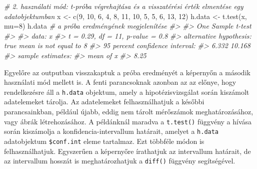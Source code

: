 \documentclass[
]{book}
\newenvironment{Shaded}{\begin{snugshade}}{\end{snugshade}}
\newcommand{\AttributeTok}[1]{\textcolor[rgb]{0.77,0.63,0.00}{#1}}
\newcommand{\CommentTok}[1]{\textcolor[rgb]{0.56,0.35,0.01}{\textit{#1}}}
\newcommand{\DecValTok}[1]{\textcolor[rgb]{0.00,0.00,0.81}{#1}}
\newcommand{\FunctionTok}[1]{\textcolor[rgb]{0.00,0.00,0.00}{#1}}
\newcommand{\NormalTok}[1]{#1}
\newcommand{\OtherTok}[1]{\textcolor[rgb]{0.56,0.35,0.01}{#1}}
\newcommand{\SpecialCharTok}[1]{\textcolor[rgb]{0.00,0.00,0.00}{#1}}
\begin{document}
\begin{Shaded}
\begin{Highlighting}[]
\CommentTok{\# 2. használati mód: t{-}próba végrehajtása és a visszatérési érték elmentése egy adatobjektumban}
\NormalTok{x }\OtherTok{\textless{}{-}} \FunctionTok{c}\NormalTok{(}\DecValTok{9}\NormalTok{, }\DecValTok{10}\NormalTok{, }\DecValTok{6}\NormalTok{, }\DecValTok{4}\NormalTok{, }\DecValTok{8}\NormalTok{, }\DecValTok{11}\NormalTok{, }\DecValTok{10}\NormalTok{, }\DecValTok{5}\NormalTok{, }\DecValTok{5}\NormalTok{, }\DecValTok{6}\NormalTok{, }\DecValTok{13}\NormalTok{, }\DecValTok{12}\NormalTok{)}
\NormalTok{h.data }\OtherTok{\textless{}{-}} \FunctionTok{t.test}\NormalTok{(x, }\AttributeTok{mu=}\DecValTok{8}\NormalTok{)  }
\NormalTok{h.data }\CommentTok{\# a próba eredményének megjelenítése}
\CommentTok{\#\textgreater{} }
\CommentTok{\#\textgreater{}  One Sample t{-}test}
\CommentTok{\#\textgreater{} }
\CommentTok{\#\textgreater{} data:  x}
\CommentTok{\#\textgreater{} t = 0.29, df = 11, p{-}value = 0.8}
\CommentTok{\#\textgreater{} alternative hypothesis: true mean is not equal to 8}
\CommentTok{\#\textgreater{} 95 percent confidence interval:}
\CommentTok{\#\textgreater{}   6.332 10.168}
\CommentTok{\#\textgreater{} sample estimates:}
\CommentTok{\#\textgreater{} mean of x }
\CommentTok{\#\textgreater{}      8.25}
\end{Highlighting}
\end{Shaded}

Egyelőre az outputban visszakaptuk a próba eredményét a képernyőn a második használati mód mellett is. A fenti parancsoknak azonban az az előnye, hogy rendelkezésre áll a \texttt{h.data} objektum, amely a hipotézisvizsgálat során kiszámolt adatelemeket tárolja. Az adatelemeket felhasználhatjuk a későbbi parancsainkban, például újabb, eddig nem tárolt mérőszámok meghatározásához, vagy ábrák létrehozásához. A példánknál maradva a \texttt{t.test()} függvény a hívása során kiszámolja a konfidencia-intervallum határait, amelyet a \texttt{h.data} adatobjektum \texttt{\$conf.int} eleme tartalmaz. Ezt többféle módon is felhasználhatjuk. Egyszerűen a képernyőre írathatjuk az intervallum határait, de az intervallum hosszát is meghatározhatjuk a \texttt{diff()} függvény segítségével.

\begin{Shaded}
\end{Shaded}
\end{document}
